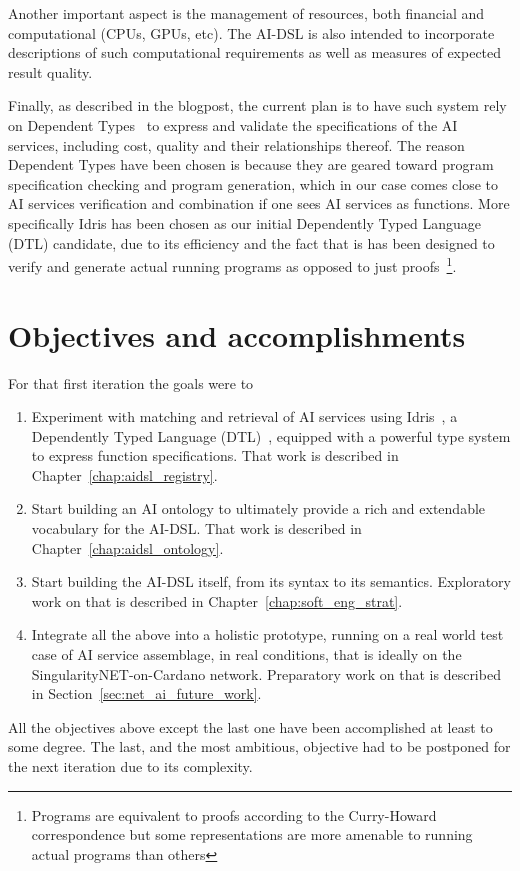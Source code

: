 \documentclass[]{report}
\begin{document}
Another important aspect is the management of resources, both
financial and computational (CPUs, GPUs, etc).  The AI-DSL is also
intended to incorporate descriptions of such computational
requirements as well as measures of expected result quality.

Finally, as described in the blogpost, the current plan is to have
such system rely on Dependent Types~\cite{Altenkirch05whydependent} to
express and validate the specifications of the AI services, including
cost, quality and their relationships thereof.  The reason Dependent Types
have been chosen is because they are geared toward program
specification checking and program generation, which in our case comes
close to AI services verification and combination if one sees AI services as functions.
More specifically Idris has been chosen as our initial Dependently
Typed Language (DTL) candidate, due to its efficiency and the fact
that is has been designed to verify and generate actual running
programs as opposed to just proofs~\footnote{Programs are equivalent
to proofs according to the Curry-Howard correspondence but some
representations are more amenable to running actual programs than
others}.

\section{Objectives and accomplishments}
For that first iteration the goals were to
\begin{enumerate}
\item Experiment with matching and retrieval of AI services using
  Idris~\cite{Idris}, a Dependently Typed Language (DTL)~\cite{DTL},
  equipped with a powerful type system to express function
  specifications.  That work is described in
  Chapter~\ref{chap:aidsl_registry}.
\item Start building an AI ontology to ultimately provide a rich and
  extendable vocabulary for the AI-DSL.  That work is described in
  Chapter~\ref{chap:aidsl_ontology}.
\item Start building the AI-DSL itself, from its syntax to its
  semantics.  Exploratory work on that is described in
  Chapter~\ref{chap:soft_eng_strat}.
\item Integrate all the above into a holistic prototype, running on a
  real world test case of AI service assemblage, in real conditions,
  that is ideally on the SingularityNET-on-Cardano network.
  Preparatory work on that is described in
  Section~\ref{sec:net_ai_future_work}.
\end{enumerate}
All the objectives above except the last one have been accomplished at
least to some degree.  The last, and the most ambitious, objective had
to be postponed for the next iteration due to its complexity.
\end{document}
